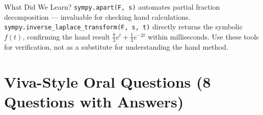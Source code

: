 \documentclass[12pt,a4paper]{article}
\begin{document}
\begin{learnbox}{What Did We Learn?}
\texttt{sympy.apart(F, s)} automates partial fraction decomposition ---
invaluable for checking hand calculations.
\texttt{sympy.inverse\_laplace\_transform(F, s, t)} directly returns the symbolic
$f(t)$, confirming the hand result $\frac{8}{3}e^{t}+\frac{1}{3}e^{-2t}$
within milliseconds.  Use these tools for verification, not as a substitute for
understanding the hand method.
\end{learnbox}

\section{Viva-Style Oral Questions (8 Questions with Answers)}
\end{document}
